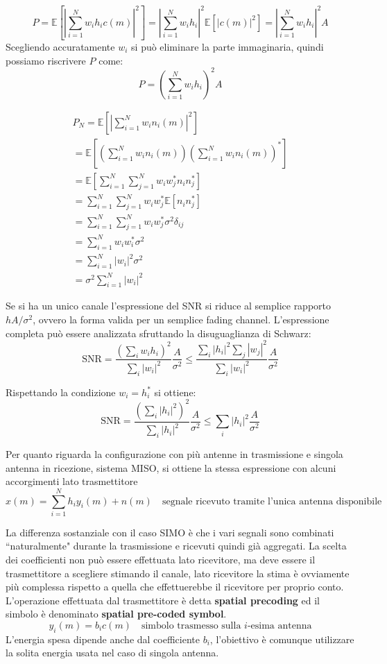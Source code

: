 \[
    P = \mathbb{E} \left[ \left|  \sum_{i=1}^{N} w_i h_i c(m)  \right| ^2  \right] = \left| \sum_{i=1}^{N} w_i h_i \right|^2 \mathbb{E} \left[ \left| c(m)\right|^2  \right] = \left| \sum_{i=1}^{N} w_i h_i \right|^2 A
\]
Scegliendo accuratamente $w_i$ si può eliminare la parte immaginaria, quindi possiamo riscrivere $P$ come:
\[
    P = \left( \sum_{i=1}^{N} w_i h_i \right)^2 A
\]

\[
    \begin{array}{ll}
            P_N = \mathbb{E} \left[ \left| \sum_{i=1}^{N} w_i n_i(m)  \right|^2 \right] \\
            = \mathbb{E} \left[ \left( \sum_{i=1}^{N} w_i n_i(m) \right)  \left( \sum_{i=1}^{N} w_i n_i(m) \right)^*  \right] \\
            = \mathbb{E} \left[  \sum_{i=1}^{N} \sum_{j=1}^{N} w_i w_j^* n_i n_j^*  \right] \\
            = \sum_{i=1}^{N} \sum_{j=1}^{N} w_i w_j^* \mathbb{E} \left[ n_i n_j^* \right] \\
            = \sum_{i=1}^{N} \sum_{j=1}^{N} w_i w_j^* \sigma^2 \delta_{ij} \\
            = \sum_{i=1}^{N} w_i w_i^* \sigma^2 \\
            = \sum_{i=1}^{N} |w_i|^2 \sigma^2 \\
            = \sigma^2 \sum_{i=1}^{N} |w_i|^2 
    \end{array}
\]

Se si ha un unico canale l'espressione del SNR si riduce al semplice rapporto $hA/\sigma^2$, ovvero la forma valida per un semplice fading channel.
L'espressione completa può essere analizzata sfruttando la disuguaglianza di Schwarz:
\[
    \text{SNR} = \frac{\left(\sum_{i} w_i h_i \right)^2}{\sum_{i} |w_i|^2} \frac{A}{\sigma ^2} \leq \frac{\sum_{i} |h_i|^2 \sum_{j} \left| w_j \right|^2}{\sum_{i} |w_i|^2} \frac{A}{\sigma^2}
\]


Rispettando la condizione $w_i = h_i^*$ si ottiene:
\[
    \text{SNR} = \frac{\left(\sum_{i} \left| h_i \right|^2 \right)^2}{\sum_{i} |h_i|^2} \frac{A}{\sigma ^2} \leq \sum_{i} |h_i|^2 \frac{A}{\sigma^2}
\]


Per quanto riguarda la configurazione con più antenne in trasmissione e singola antenna in ricezione, sistema MISO, si ottiene la stessa espressione con alcuni accorgimenti lato trasmettitore
\[
    x(m) = \sum_{i=1}^{N} h_i y_i(m) + n(m) \quad \text{segnale ricevuto tramite l'unica antenna disponibile}
\]


La differenza sostanziale con il caso SIMO è che i vari segnali sono combinati ``naturalmente" durante la trasmissione e ricevuti quindi già aggregati. 
La scelta dei coefficienti non può essere effettuata lato ricevitore, ma deve essere il trasmettitore a scegliere stimando il canale, lato ricevitore la stima è ovviamente più complessa rispetto a quella che effettuerebbe il ricevitore per proprio conto.
L'operazione effettuata dal trasmettitore è detta \textbf{spatial precoding} ed il simbolo è denominato \textbf{spatial pre-coded symbol}.
\[
    y_i(m) = b_i c(m) \quad \text{simbolo trasmesso sulla $i$-esima antenna}
\]
L'energia spesa dipende anche dal coefficiente $b_i$, l'obiettivo è comunque utilizzare la solita energia usata nel caso di singola antenna.

